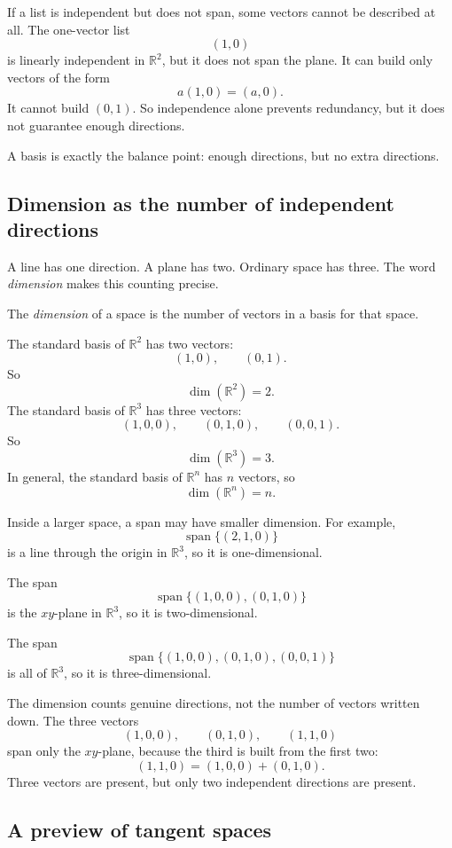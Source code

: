 If a list is independent but does not span, some vectors cannot be described at all.
The one-vector list
\[
    (1,0)
\]
is linearly independent in \(\mathbb R^2\), but it does not span the plane.  It can
build only vectors of the form
\[
    a(1,0)=(a,0).
\]
It cannot build \((0,1)\).  So independence alone prevents redundancy, but it does not
guarantee enough directions.

A basis is exactly the balance point: enough directions, but no extra directions.

\subsection{Dimension as the number of independent directions}

A line has one direction.  A plane has two.  Ordinary space has three.  The word
\emph{dimension} makes this counting precise.

\begin{definition}[Dimension]
The \emph{dimension} of a space is the number of vectors in a basis for that space.
\end{definition}

The standard basis of \(\mathbb R^2\) has two vectors:
\[
    (1,0),\qquad (0,1).
\]
So
\[
    \dim(\mathbb R^2)=2.
\]
The standard basis of \(\mathbb R^3\) has three vectors:
\[
    (1,0,0),\qquad (0,1,0),\qquad (0,0,1).
\]
So
\[
    \dim(\mathbb R^3)=3.
\]
In general, the standard basis of \(\mathbb R^n\) has \(n\) vectors, so
\[
    \dim(\mathbb R^n)=n.
\]

Inside a larger space, a span may have smaller dimension.  For example,
\[
    \operatorname{span}\{(2,1,0)\}
\]
is a line through the origin in \(\mathbb R^3\), so it is one-dimensional.

The span
\[
    \operatorname{span}\{(1,0,0),(0,1,0)\}
\]
is the \(xy\)-plane in \(\mathbb R^3\), so it is two-dimensional.

The span
\[
    \operatorname{span}\{(1,0,0),(0,1,0),(0,0,1)\}
\]
is all of \(\mathbb R^3\), so it is three-dimensional.

The dimension counts genuine directions, not the number of vectors written down.  The
three vectors
\[
    (1,0,0),\qquad (0,1,0),\qquad (1,1,0)
\]
span only the \(xy\)-plane, because the third is built from the first two:
\[
    (1,1,0)=(1,0,0)+(0,1,0).
\]
Three vectors are present, but only two independent directions are present.

\subsection{A preview of tangent spaces}

